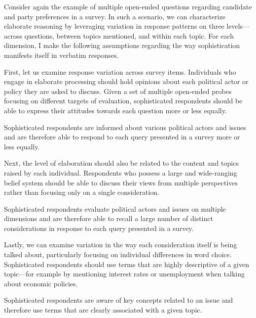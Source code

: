 Consider again the example of multiple open-ended questions regarding candidate and party preferences in a survey. In such a scenario, we can characterize elaborate reasoning by leveraging variation in response patterns on three levels---across questions, between topics mentioned, and within each topic. For each dimension, I make the following assumptions regarding the way sophistication manifests itself in verbatim responses.

First, let us examine response variation across survey items. Individuals who engage in elaborate processing should hold opinions about each political actor or policy they are asked to discuss. Given a set of multiple open-ended probes focusing on different targets of evaluation, sophisticated respondents should be able to express their attitudes towards each question more or less equally.%

\clearpage
\begin{assumption}[Opinionation]
Sophisticated respondents are informed about various political actors and issues and are therefore able to respond to each query presented in a survey more or less equally.
\end{assumption}

Next, the level of elaboration should also be related to the content and topics raised by each individual. Respondents who possess a large and wide-ranging belief system should be able to discuss their views from multiple perspectives rather than focusing only on a single consideration.

\begin{assumption}[Considerations]
Sophisticated respondents evaluate political actors and issues on multiple dimensions and are therefore able to recall a large number of distinct considerations in response to each query presented in a survey. 
\end{assumption}

Lastly, we can examine variation in the way each consideration itself is being talked about, particularly focusing on individual differences in word choice. Sophisticated respondents should use terms that are highly descriptive of a given topic---for example by mentioning interest rates or unemployment when talking about economic policies.

\begin{assumption}
Sophisticated respondents are aware of key concepts related to an issue and therefore use terms that are clearly associated with a given topic.
\end{assumption}

